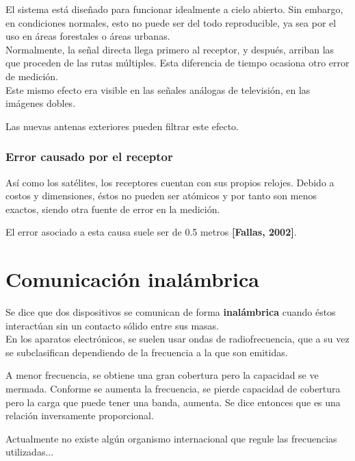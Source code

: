  El sistema está diseñado para funcionar idealmente a cielo abierto. Sin embargo, en condiciones normales, esto no puede ser del todo reproducible, ya sea por el uso en áreas forestales o áreas urbanas. \\
 
Normalmente, la señal directa llega primero al receptor, y después, arriban las que proceden de las rutas múltiples. Esta diferencia de tiempo ocasiona otro error de medición. \\

Este mismo efecto era visible en las señales análogas de televisión, en las imágenes dobles.

Las nuevas antenas exteriores pueden filtrar este efecto.

\subsubsection{Error causado por el receptor}

Así como los satélites, los receptores cuentan con sus propios relojes. Debido a costos y dimensiones, éstos no pueden ser atómicos y por tanto son menos exactos, siendo otra fuente de error en la medición.

El error asociado a esta causa suele ser de 0.5 metros \textbf{[Fallas, 2002]}.

\section{Comunicación inalámbrica}

Se dice que dos dispositivos se comunican de forma \textbf{inalámbrica} cuando éstos interactúan sin un contacto sólido entre sus masas. \\

En los aparatos electrónicos, se suelen usar ondas de radiofrecuencia, que a su vez se subclasifican dependiendo de la frecuencia a la que son emitidas.

A menor frecuencia, se obtiene una gran cobertura pero la capacidad se ve mermada. Conforme se aumenta la frecuencia, se pierde capacidad de cobertura pero la carga que puede tener una banda, aumenta. Se dice entonces que es una relación inversamente proporcional.

Actualmente no existe algún organismo internacional que regule las frecuencias utilizadas...

